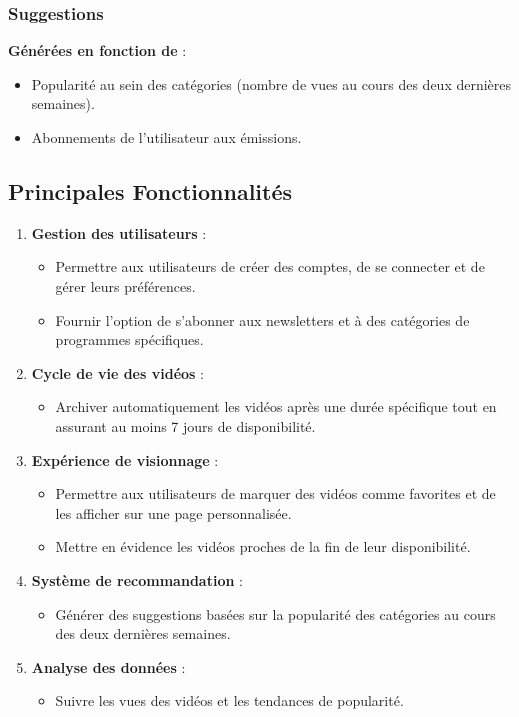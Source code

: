 \documentclass[a4paper,12pt]{article}
\begin{document}
\subsubsection{Suggestions}

\textbf{Générées en fonction de} :
\begin{itemize}
    \item Popularité au sein des catégories (nombre de vues au cours des deux dernières semaines).
    \item Abonnements de l'utilisateur aux émissions.
\end{itemize}

\subsection{Principales Fonctionnalités}

\begin{enumerate}
    \item \textbf{Gestion des utilisateurs} :
    \begin{itemize}
        \item Permettre aux utilisateurs de créer des comptes, de se connecter et de gérer leurs préférences.
        \item Fournir l'option de s'abonner aux newsletters et à des catégories de programmes spécifiques.
    \end{itemize}
    \item \textbf{Cycle de vie des vidéos} :
    \begin{itemize}
        \item Archiver automatiquement les vidéos après une durée spécifique tout en assurant au moins 7 jours de disponibilité.
    \end{itemize}
    \item \textbf{Expérience de visionnage} :
    \begin{itemize}
        \item Permettre aux utilisateurs de marquer des vidéos comme favorites et de les afficher sur une page personnalisée.
        \item Mettre en évidence les vidéos proches de la fin de leur disponibilité.
    \end{itemize}
    \item \textbf{Système de recommandation} :
    \begin{itemize}
        \item Générer des suggestions basées sur la popularité des catégories au cours des deux dernières semaines.
    \end{itemize}
    \item \textbf{Analyse des données} :
    \begin{itemize}
        \item Suivre les vues des vidéos et les tendances de popularité.
    \end{itemize}
\end{enumerate}
\end{document}
